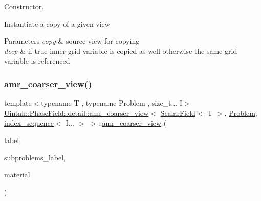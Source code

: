 Constructor. 

Instantiate a copy of a given view


\begin{DoxyParams}{Parameters}
{\em copy} & source view for copying \\
\hline
{\em deep} & if true inner grid variable is copied as well otherwise the same grid variable is referenced \\
\hline
\end{DoxyParams}
\mbox{\label{classUintah_1_1PhaseField_1_1detail_1_1amr__coarser__view_3_01ScalarField_3_01T_01_4_00_01Proble9cadea116dab5bdb44bb3e29abbe99ef_a028eef83d6df8dcc30eddb8595f628c3}} 
\subsubsection{\texorpdfstring{amr\+\_\+coarser\+\_\+view()}{amr\_coarser\_view()}\hspace{0.1cm}{\footnotesize\ttfamily [2/4]}}
{\footnotesize\ttfamily template$<$typename T , typename Problem , size\+\_\+t... I$>$ \\
\hyperlink{classUintah_1_1PhaseField_1_1detail_1_1amr__coarser__view}{Uintah\+::\+Phase\+Field\+::detail\+::amr\+\_\+coarser\+\_\+view}$<$ \hyperlink{structUintah_1_1PhaseField_1_1ScalarField}{Scalar\+Field}$<$ T $>$, \hyperlink{classUintah_1_1PhaseField_1_1Problem}{Problem}, \hyperlink{namespaceUintah_1_1PhaseField_a237de804d99512e50613aff7c94a9461}{index\+\_\+sequence}$<$ I... $>$ $>$\+::\hyperlink{classUintah_1_1PhaseField_1_1detail_1_1amr__coarser__view}{amr\+\_\+coarser\+\_\+view} (\begin{DoxyParamCaption}\item[{const Var\+Label $\ast$}]{label,  }\item[{const Var\+Label $\ast$}]{subproblems\+\_\+label,  }\item[{int}]{material }\end{DoxyParamCaption})\hspace{0.3cm}{\ttfamily [inline]}}



